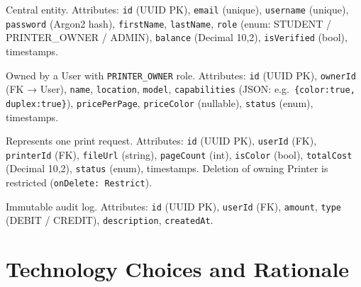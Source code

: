 \documentclass[12pt,a4paper]{report}
\begin{document}
\begin{description}[leftmargin=2em, style=nextline]
  \item[\texttt{User}] Central entity. Attributes: \texttt{id} (UUID PK), \texttt{email}
    (unique), \texttt{username} (unique), \texttt{password} (Argon2 hash),
    \texttt{firstName}, \texttt{lastName}, \texttt{role} (enum: STUDENT / PRINTER\_OWNER /
    ADMIN), \texttt{balance} (Decimal 10,2), \texttt{isVerified} (bool), timestamps.
  \item[\texttt{Printer}] Owned by a User with \texttt{PRINTER\_OWNER} role. Attributes:
    \texttt{id} (UUID PK), \texttt{ownerId} (FK → User), \texttt{name}, \texttt{location},
    \texttt{model}, \texttt{capabilities} (JSON: e.g.\ \texttt{\{color:true, duplex:true\}}),
    \texttt{pricePerPage}, \texttt{priceColor} (nullable), \texttt{status} (enum),
    timestamps.
  \item[\texttt{PrintJob}] Represents one print request. Attributes: \texttt{id} (UUID PK),
    \texttt{userId} (FK), \texttt{printerId} (FK), \texttt{fileUrl} (string),
    \texttt{pageCount} (int), \texttt{isColor} (bool), \texttt{totalCost} (Decimal 10,2),
    \texttt{status} (enum), timestamps. Deletion of owning Printer is restricted
    (\texttt{onDelete: Restrict}).
  \item[\texttt{CreditLedger}] Immutable audit log. Attributes: \texttt{id} (UUID PK),
    \texttt{userId} (FK), \texttt{amount}, \texttt{type} (DEBIT / CREDIT),
    \texttt{description}, \texttt{createdAt}.
\end{description}

\section{Technology Choices and Rationale}
\end{document}
